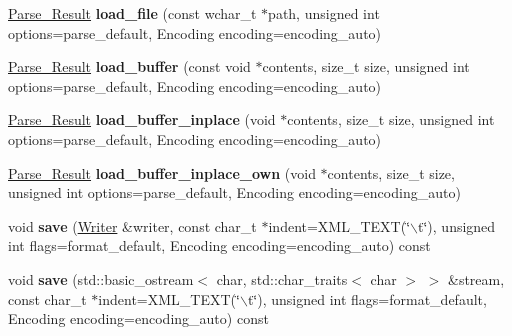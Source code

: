\begin{DoxyCompactItemize}
\item 
\hypertarget{classphys_1_1xml_1_1Document_a0f7c366d09fbc0992e230921233601ca}{
\hyperlink{structphys_1_1xml_1_1Parse__Result}{Parse\_\-Result} {\bfseries load\_\-file} (const wchar\_\-t $\ast$path, unsigned int options=parse\_\-default, Encoding encoding=encoding\_\-auto)}
\label{dd/d44/classphys_1_1xml_1_1Document_a0f7c366d09fbc0992e230921233601ca}

\item 
\hypertarget{classphys_1_1xml_1_1Document_a344ea0b2865ed0b34b8f7521b0712f8a}{
\hyperlink{structphys_1_1xml_1_1Parse__Result}{Parse\_\-Result} {\bfseries load\_\-buffer} (const void $\ast$contents, size\_\-t size, unsigned int options=parse\_\-default, Encoding encoding=encoding\_\-auto)}
\label{dd/d44/classphys_1_1xml_1_1Document_a344ea0b2865ed0b34b8f7521b0712f8a}

\item 
\hypertarget{classphys_1_1xml_1_1Document_aab3e0f17e16301ea38ec335915e2dcaf}{
\hyperlink{structphys_1_1xml_1_1Parse__Result}{Parse\_\-Result} {\bfseries load\_\-buffer\_\-inplace} (void $\ast$contents, size\_\-t size, unsigned int options=parse\_\-default, Encoding encoding=encoding\_\-auto)}
\label{dd/d44/classphys_1_1xml_1_1Document_aab3e0f17e16301ea38ec335915e2dcaf}

\item 
\hypertarget{classphys_1_1xml_1_1Document_ab76a996597b854e61ff0433832eef070}{
\hyperlink{structphys_1_1xml_1_1Parse__Result}{Parse\_\-Result} {\bfseries load\_\-buffer\_\-inplace\_\-own} (void $\ast$contents, size\_\-t size, unsigned int options=parse\_\-default, Encoding encoding=encoding\_\-auto)}
\label{dd/d44/classphys_1_1xml_1_1Document_ab76a996597b854e61ff0433832eef070}

\item 
\hypertarget{classphys_1_1xml_1_1Document_a8c27a11a0f2f632265f85e292247d2e2}{
void {\bfseries save} (\hyperlink{classphys_1_1xml_1_1Writer}{Writer} \&writer, const char\_\-t $\ast$indent=XML\_\-TEXT(\char`\"{}$\backslash$t\char`\"{}), unsigned int flags=format\_\-default, Encoding encoding=encoding\_\-auto) const }
\label{dd/d44/classphys_1_1xml_1_1Document_a8c27a11a0f2f632265f85e292247d2e2}

\item 
\hypertarget{classphys_1_1xml_1_1Document_addda0a55772282c6887637a7531fc139}{
void {\bfseries save} (std::basic\_\-ostream$<$ char, std::char\_\-traits$<$ char $>$ $>$ \&stream, const char\_\-t $\ast$indent=XML\_\-TEXT(\char`\"{}$\backslash$t\char`\"{}), unsigned int flags=format\_\-default, Encoding encoding=encoding\_\-auto) const }
\label{dd/d44/classphys_1_1xml_1_1Document_addda0a55772282c6887637a7531fc139}


\end{DoxyCompactItemize}
